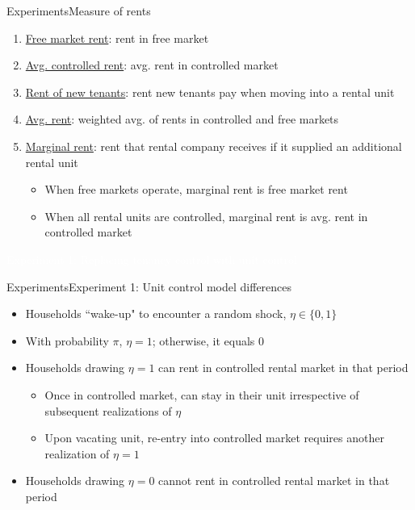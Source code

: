 \documentclass[11pt,aspectratio=169]{beamer}
\begin{document}
\begin{frame}{Experiments}{Measure of rents}

\begin{enumerate}
    \item \underline{Free market rent}: rent in free market
    \item \underline{Avg. controlled rent}: avg. rent in controlled market
    \item \underline{Rent of new tenants}: rent new tenants pay when moving into a rental unit
    \item \underline{Avg. rent}: weighted avg. of rents in controlled and free markets
    \item \underline{Marginal rent}: rent that rental company receives if it supplied an additional rental unit
    \begin{itemize}
        \item When free markets operate, marginal rent is free market rent
        \item When all rental units are controlled, marginal rent is avg. rent in controlled market
    \end{itemize}
\end{enumerate}

\end{frame}

{
\begin{frame}{}

\centering \Large
\textcolor{white}{Experiment 1: Replacing tenancy control with unit control}
    
\end{frame}

}

\begin{frame}{Experiments}{Experiment 1: Unit control model differences}

    \begin{itemize}
    \item Households “wake-up" to encounter a random shock, $\eta \in\{0,1\}$
    \item With probability $\pi$, $\eta=1$; otherwise, it equals 0
    \item Households drawing $\eta=1$ can rent in controlled rental market in that period
    \begin{itemize}
        \item Once in controlled market, can stay in their unit irrespective of subsequent realizations of $\eta$
        \item Upon vacating unit, re-entry into controlled market requires another realization of $\eta=1$
    \end{itemize}
    \item Households drawing $\eta=0$ cannot rent in controlled rental market in that period
    \end{itemize}

\end{frame}
\end{document}
